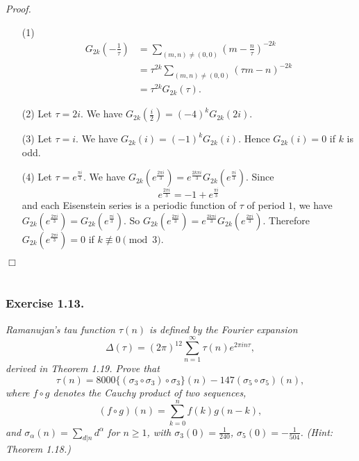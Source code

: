 \documentclass{article}
\begin{document}
\emph{Proof.}
\begin{enumerate}
\item[(1)]
  \begin{align*}
    G_{2k}\left(-\frac{1}{\tau}\right)
    &= \sum_{(m,n) \neq (0,0)} \left(m - \frac{n}{\tau}\right)^{-2k} \\
    &= \tau^{2k} \sum_{(m,n) \neq (0,0)} (\tau m - n)^{-2k} \\
    &= \tau^{2k} G_{2k}(\tau).
  \end{align*}

\item[(2)]
  Let $\tau = 2i$.
  We have $G_{2k}\left(\frac{i}{2}\right) = (-4)^k G_{2k}(2i)$.

\item[(3)]
  Let $\tau = i$.
  We have $G_{2k}(i) = (-1)^k G_{2k}(i)$.
  Hence $G_{2k}(i) = 0$ if $k$ is odd.

\item[(4)]
  Let $\tau = e^{\frac{\pi i}{3}}$.
  We have $G_{2k}(e^{\frac{2\pi i}{3}}) = e^{\frac{2k \pi i}{3}} G_{2k}(e^{\frac{\pi i}{3}})$.
  Since
  \[
    e^{\frac{2\pi i}{3}} = -1 + e^{\frac{\pi i}{3}}
  \]
  and each Eisenstein series is a periodic function of $\tau$ of period $1$,
  we have $G_{2k}(e^{\frac{2\pi i}{3}}) = G_{2k}(e^{\frac{\pi i}{3}})$.
  So $G_{2k}(e^{\frac{2\pi i}{3}}) = e^{\frac{2k \pi i}{3}} G_{2k}(e^{\frac{2\pi i}{3}})$.
  Therefore $G_{2k}(e^{\frac{2\pi i}{3}}) = 0$ if $k \not\equiv 0 \pmod{3}$.
\end{enumerate}
$\Box$ \\\\






\subsubsection*{Exercise 1.13.}
\emph{Ramanujan's tau function $\tau(n)$ is defined by the Fourier expansion
\[
  \Delta(\tau)
  =
  (2\pi)^{12} \sum_{n=1}^{\infty} \tau(n) e^{2\pi i n \tau},
\]
derived in Theorem 1.19.
Prove that
\[
  \tau(n)
  =
  8000 \{ (\sigma_3 \circ \sigma_3) \circ \sigma_3 \}(n)
  - 147( \sigma_5 \circ \sigma_5 )(n),
\]
where $f \circ g$ denotes the Cauchy product of two sequences,
\[
  (f \circ g)(n) = \sum_{k=0}^{n} f(k)g(n-k),
\]
and $\sigma_\alpha(n) = \sum_{d|n} d^{\alpha}$ for $n \geq 1$,
with $\sigma_3(0) = \frac{1}{240}$, $\sigma_5(0) = -\frac{1}{504}$.
(Hint: Theorem 1.18.)} \\
\end{document}
